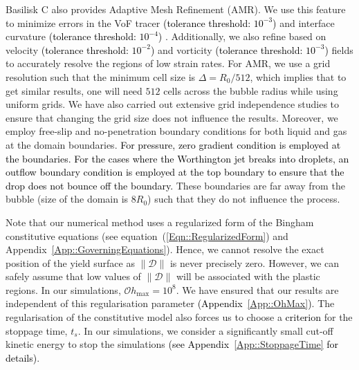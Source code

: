 \documentclass[final]{jfm}
\newcommand*\red{\textcolor{black}}
\begin{document}
Basilisk C also provides Adaptive Mesh Refinement (AMR). We use this feature to minimize errors in the VoF tracer \red{(tolerance threshold: $10^{-3}$)} and interface curvature \red{(tolerance threshold: $10^{-4}$)} . Additionally, we also refine based on velocity \red{(tolerance threshold: $10^{-2}$)} and vorticity \red{(tolerance threshold: $10^{-3}$)} fields to accurately resolve the regions of low strain rates. For AMR, we use a grid resolution such that the minimum cell size is $\Delta = R_0/512$, which implies that to get similar results, one will need $512$ cells across the bubble radius while using uniform grids. We have also carried out extensive grid independence studies to ensure that changing the grid size does not influence the results. Moreover, we employ free-slip and no-penetration boundary conditions for both liquid and gas at the domain boundaries.  \red{For pressure, zero gradient condition is employed at the boundaries. For the cases where the Worthington jet breaks into droplets, an outflow boundary condition is employed at the top boundary to ensure that the drop does not bounce off the boundary.} These boundaries are far away from the bubble (size of the domain is $8R_0$)  such that they do not influence the process. 

Note that our numerical method uses a regularized form of the Bingham constitutive equations (see equation~(\ref{Eqn::RegularizedForm}) and Appendix~\ref{App::GoverningEquations}). Hence, we cannot resolve the exact position of the yield surface as $\|\boldsymbol{\mathcal{D}}\|$ is never precisely zero. However, we can safely assume that low values of $\|\boldsymbol{\mathcal{D}}\|$ will be associated with the plastic regions. In our simulations, $\mathcal{O}h_{\text{max}}=10^8$. We have ensured that our results are independent of this regularisation parameter \red{(Appendix~\ref{App::OhMax})}. The regularisation of the constitutive model also forces us to choose a \red{criterion} for the stoppage time, $t_s$. In our simulations, we consider a significantly small cut-off kinetic energy to stop the simulations \red{(see Appendix~\ref{App::StoppageTime} for details)}. 
\end{document}
